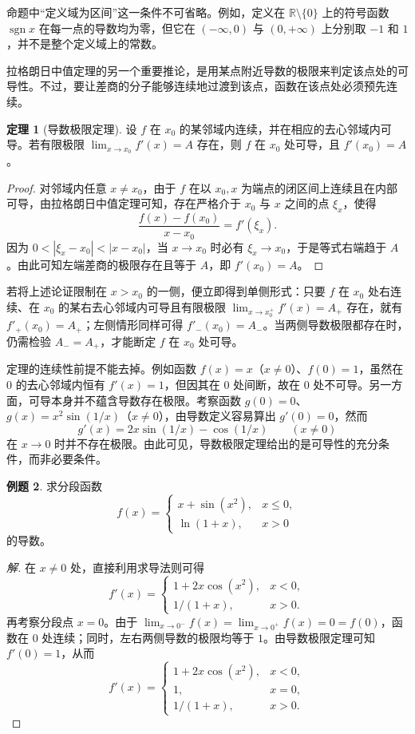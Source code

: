 \documentclass[UTF8,fontset=fandol,a4paper,12pt]{ctexart}
\newcommand{\R}{\mathbb R}
\theoremstyle{definition}
\newtheorem{theorem}{定理}[section]
\newtheorem{example}[theorem]{例题}
\begin{document}
命题中“定义域为区间”这一条件不可省略。例如，定义在 $\R\setminus\{0\}$ 上的符号函数 $\operatorname{sgn}x$ 在每一点的导数均为零，但它在 $(-\infty,0)$ 与 $(0,+\infty)$ 上分别取 $-1$ 和 $1$，并不是整个定义域上的常数。

拉格朗日中值定理的另一个重要推论，是用某点附近导数的极限来判定该点处的可导性。不过，要让差商的分子能够连续地过渡到该点，函数在该点处必须预先连续。

\begin{theorem}[导数极限定理]
设 $f$ 在 $x_0$ 的某邻域内连续，并在相应的去心邻域内可导。若有限极限 $\lim_{x\to x_0}f'(x)=A$ 存在，则 $f$ 在 $x_0$ 处可导，且 $f'(x_0)=A$。
\end{theorem}

\begin{proof}
对邻域内任意 $x\ne x_0$，由于 $f$ 在以 $x_0,x$ 为端点的闭区间上连续且在内部可导，由拉格朗日中值定理可知，存在严格介于 $x_0$ 与 $x$ 之间的点 $\xi_x$，使得
\[
 \frac{f(x)-f(x_0)}{x-x_0}=f'(\xi_x).
\]
因为 $0<|\xi_x-x_0|<|x-x_0|$，当 $x\to x_0$ 时必有 $\xi_x\to x_0$，于是等式右端趋于 $A$。由此可知左端差商的极限存在且等于 $A$，即 $f'(x_0)=A$。
\end{proof}

若将上述论证限制在 $x>x_0$ 的一侧，便立即得到单侧形式：只要 $f$ 在 $x_0$ 处右连续、在 $x_0$ 的某右去心邻域内可导且有限极限 $\lim_{x\to x_0^+}f'(x)=A_+$ 存在，就有 $f'_+(x_0)=A_+$；左侧情形同样可得 $f'_-(x_0)=A_-$。当两侧导数极限都存在时，仍需检验 $A_-=A_+$，才能断定 $f$ 在 $x_0$ 处可导。

定理的连续性前提不能去掉。例如函数 $f(x)=x$（$x\ne0$）、$f(0)=1$，虽然在 $0$ 的去心邻域内恒有 $f'(x)=1$，但因其在 $0$ 处间断，故在 $0$ 处不可导。另一方面，可导本身并不蕴含导数存在极限。考察函数 $g(0)=0$、$g(x)=x^2\sin(1/x)$（$x\ne0$），由导数定义容易算出 $g'(0)=0$，然而
\[
 g'(x)=2x\sin(1/x)-\cos(1/x)\qquad(x\ne0)
\]
在 $x\to0$ 时并不存在极限。由此可见，导数极限定理给出的是可导性的充分条件，而非必要条件。

\begin{example}
求分段函数
\[
 f(x)=\begin{cases}
 x+\sin(x^2),&x\le0,\\
 \ln(1+x),&x>0
 \end{cases}
\]
的导数。
\end{example}

\begin{proof}[解]
在 $x\ne0$ 处，直接利用求导法则可得
\[
 f'(x)=\begin{cases}1+2x\cos(x^2),&x<0,\\1/(1+x),&x>0.\end{cases}
\]
再考察分段点 $x=0$。由于 $\lim_{x\to0^-}f(x)=\lim_{x\to0^+}f(x)=0=f(0)$，函数在 $0$ 处连续；同时，左右两侧导数的极限均等于 $1$。由导数极限定理可知 $f'(0)=1$，从而
\[
 f'(x)=\begin{cases}1+2x\cos(x^2),&x<0,\\1,&x=0,\\1/(1+x),&x>0.\end{cases}
\]
\end{proof}
\end{document}
